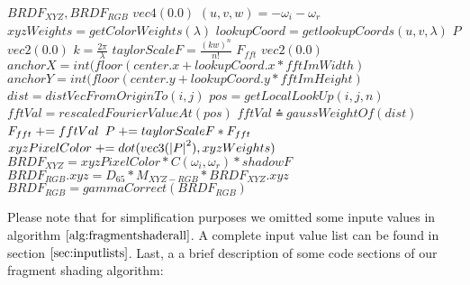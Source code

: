 \begin{algorithm}[H]
  \setlength{\fboxrule}{0pt} 
  \begin{boxedminipage}{1.0\textwidth}
  \begin{algorithmic}[1]
      \State \init $BRDF_{XYZ}, BRDF_{RGB}$ \myto $vec4(0.0)$
      \State $(u,v,w) = -\omega_i - \omega_r$
        \State $xyzWeights = getColorWeights(\lambda)$
        \State $lookupCoord = getlookupCoords(u, v, \lambda)$
        \State \init $P$ \myto $vec2(0.0)$
        \State $k = \frac{2\pi}{\lambda}$
          \State $taylorScaleF = \frac{(kw)^n}{n!}$
          \State \init $F_{fft}$  \myto $vec2(0.0)$
          \State $anchorX = int(floor(center.x + lookupCoord.x * fftImWidth)$
          \State $anchorY = int(floor(center.y + lookupCoord.y * fftImHeight)$
              \State $dist = distVecFromOriginTo(i,j)$
              \State $pos = getLocalLookUp(i,j,n)$
              \State $fftVal = rescaledFourierValueAt(pos)$
              \State $fftVal \asteq gaussWeightOf(dist)$
              \State $F_{fft} \mathrel{+}= fftVal$
            \EndFor
          \EndFor
          \State $P \mathrel{+}= taylorScaleF*F_{fft}$
        \EndFor
        \State $xyzPixelColor \mathrel{+}= dot(vec3(\left|P\right|^2), xyzWeights)$
      \EndFor
      \State $BRDF_{XYZ} = xyzPixelColor*C(\omega_i, \omega_r)*shadowF$
      \State $BRDF_{RGB}.xyz = D_{65}*M_{XYZ-RGB}*BRDF_{XYZ}.xyz$
      \State $BRDF_{RGB}= gammaCorrect(BRDF_{RGB})$
    \EndFor
  \end{algorithmic}
  \end{boxedminipage}
  \vskip1.5pt
  \label{alg:fragmentshaderall}
\end{algorithm}

Please note that for simplification purposes we omitted some inpute values in algorithm $\ref{alg:fragmentshaderall}$. A complete input value list can be found in section $\ref{sec:inputlists}$. Last, a a brief description of some code sections of our fragment shading algorithm:

